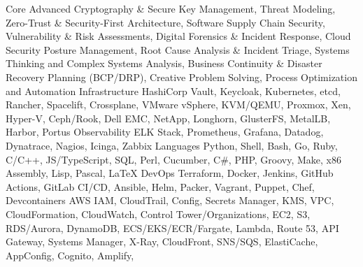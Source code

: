 \begin{cvskills}
    \cvskill
        { Core }
        {
          Advanced Cryptography \& Secure Key Management,
          Threat Modeling,
          Zero-Trust \& Security-First Architecture,
          Software Supply Chain Security,
          Vulnerability \& Risk Assessments,
          Digital Forensics \& Incident Response,
          Cloud Security Posture Management,
          Root Cause Analysis \& Incident Triage,
          Systems Thinking and Complex Systems Analysis,
          Business Continuity \& Disaster Recovery Planning (BCP/DRP),
          Creative Problem Solving,
          Process Optimization and Automation
        }
    \cvskill
        { Infrastructure }
        {
          HashiCorp Vault,
          Keycloak,
          Kubernetes,
          etcd,
          Rancher,
          Spacelift,
          Crossplane,
          VMware vSphere,
          KVM/QEMU,
          Proxmox,
          Xen,
          Hyper-V,
          Ceph/Rook,
          Dell EMC,
          NetApp,
          Longhorn,
          GlusterFS,
          MetalLB,
          Harbor,
          Portus
        }
    \cvskill
        { Observability }
        {
          ELK Stack,
          Prometheus,
          Grafana,
          Datadog,
          Dynatrace,
          Nagios,
          Icinga,
          Zabbix
        }
    \cvskill
        { Languages }
        {
          Python,
          Shell,
          Bash,
          Go,
          Ruby,
          C/C++,
          JS/TypeScript,
          SQL,
          Perl,
          Cucumber,
          C\#,
          PHP,
          Groovy,
          Make,
          x86 Assembly,
          Lisp,
          Pascal,
          LaTeX
        }
    \cvskill
        { DevOps }
        {
          Terraform,
          Docker,
          Jenkins,
          GitHub Actions,
          GitLab CI/CD,
          Ansible,
          Helm,
          Packer,
          Vagrant,
          Puppet,
          Chef,
          Devcontainers
        }
    \cvskill
        { AWS }
        {
          IAM,
          CloudTrail,
          Config,
          Secrets Manager,
          KMS,
          VPC,
          CloudFormation,
          CloudWatch,
          Control Tower/Organizations,
          EC2,
          S3,
          RDS/Aurora,
          DynamoDB,
          ECS/EKS/ECR/Fargate,
          Lambda,
          Route 53,
          API Gateway,
          Systems Manager,
          X-Ray,
          CloudFront,
          SNS/SQS,
          ElastiCache,
          AppConfig,
          Cognito,
          Amplify,
}
\end{cvskills}
